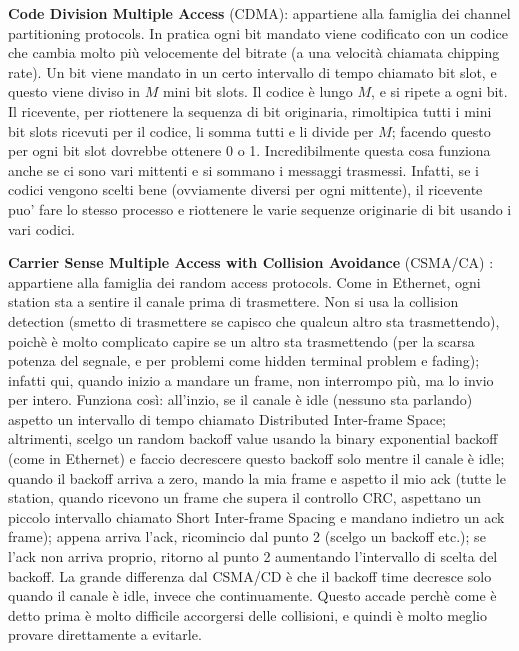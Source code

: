 \documentclass[a4paper,10pt]{article} %
\renewcommand{\b}[1]{%
    {\textbf{#1}}}
\begin{document}
\b{Code Division Multiple Access} (CDMA): appartiene alla famiglia dei channel partitioning protocols. In pratica ogni bit mandato viene codificato con un codice che cambia molto più velocemente del bitrate (a una velocità chiamata chipping rate). Un bit viene mandato in un certo intervallo di tempo chiamato bit slot, e questo viene diviso in $M$ mini bit slots. Il codice è lungo $M$, e si ripete a ogni bit. Il ricevente, per riottenere la sequenza di bit originaria, rimoltipica tutti i mini bit slots ricevuti per il codice, li somma tutti e li divide per $M$; facendo questo per ogni bit slot dovrebbe ottenere 0 o 1. Incredibilmente questa cosa funziona anche se ci sono vari mittenti e si sommano i messaggi trasmessi. Infatti, se i codici vengono scelti bene (ovviamente diversi per ogni mittente), il ricevente puo' fare lo stesso processo e riottenere le varie sequenze originarie di bit usando i vari codici.

\b{Carrier Sense Multiple Access with Collision Avoidance} (CSMA/CA) : appartiene alla famiglia dei random access protocols. Come in Ethernet, ogni station sta a sentire il canale prima di trasmettere. Non si usa la collision detection (smetto di trasmettere se capisco che qualcun altro sta trasmettendo), poichè è molto complicato capire se un altro sta trasmettendo (per la scarsa potenza del segnale, e per problemi come hidden terminal problem e fading); infatti qui, quando inizio a mandare un frame, non interrompo più, ma lo invio per intero. Funziona così: all'inzio, se il canale è idle (nessuno sta parlando) aspetto un intervallo di tempo chiamato Distributed Inter-frame Space; altrimenti, scelgo un random backoff value usando la binary exponential backoff (come in Ethernet) e faccio decrescere questo backoff solo mentre il canale è idle; quando il backoff arriva a zero, mando la mia frame e aspetto il mio ack (tutte le station, quando ricevono un frame che supera il controllo CRC, aspettano un piccolo intervallo chiamato Short Inter-frame Spacing e mandano indietro un ack frame); appena arriva l'ack, ricomincio dal punto 2 (scelgo un backoff etc.); se l'ack non arriva proprio, ritorno al punto 2 aumentando l'intervallo di scelta del backoff. La grande differenza dal CSMA/CD è che il backoff time decresce solo quando il canale è idle, invece che continuamente. Questo accade perchè come è detto prima è molto difficile accorgersi delle collisioni, e quindi è molto meglio provare direttamente a evitarle. 
\end{document}
